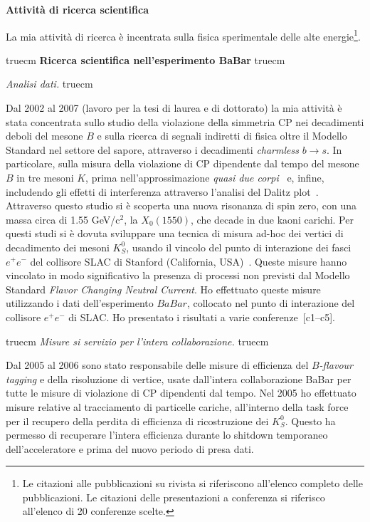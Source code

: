 \documentclass[11pt,twoside,a4paper]{article}
\begin{document}
\begin{center}
{\bf{Attivit\`a di ricerca scientifica}}
\end{center}

La mia attivit\`a di ricerca \`e incentrata sulla fisica sperimentale
delle alte energie\footnote{Le citazioni alle pubblicazioni su rivista
si riferiscono all'elenco completo delle pubblicazioni. Le citazioni
delle presentazioni a conferenza si riferisco all'elenco di 20
conferenze scelte.}.


 truecm
{\bf{Ricerca scientifica nell'esperimento BaBar}}
 truecm

\textit{Analisi dati.}
 truecm

Dal 2002 al 2007 (lavoro per la tesi di laurea e di dottorato) la mia
attivit\`a \`e stata concentrata sullo studio della violazione della
simmetria CP nei decadimenti deboli del mesone $B$ e sulla ricerca di
segnali indiretti di fisica oltre il Modello Standard nel settore del
sapore, attraverso i decadimenti \textit{charmless} $b \to s$. In
particolare, sulla misura della violazione di CP dipendente dal tempo
del mesone $B$ in tre mesoni $K$, prima nell'approssimazione
\textit{quasi due corpi}~\cite{Aubert:2008rr} e, infine, includendo
gli effetti di interferenza attraverso l'analisi del Dalitz
plot~\cite{Aubert:2007sd,Aubert:2007me}. Attraverso questo studio si
\`e scoperta una nuova risonanza di spin zero, con una massa circa di
1.55 GeV/c$^2$, la $X_0(1550)$, che decade in due kaoni carichi. Per
questi studi si \`e dovuta sviluppare una tecnica di misura ad-hoc dei
vertici di decadimento dei mesoni $K^0_S$, usando il vincolo del punto
di interazione dei fasci $e^+e^-$ del collisore SLAC di Stanford
(California, USA)~\cite{Aubert:2005dy,Aubert:2005gj}.  Queste misure
hanno vincolato in modo significativo la presenza di processi non
previsti dal Modello Standard \textit{Flavor Changing Neutral
  Current}.  Ho effettuato queste misure utilizzando i dati
dell'esperimento $BaBar$, collocato nel punto di interazione del
collisore $e^+e^-$ di SLAC. Ho presentato i risultati a varie
conferenze~[c1--c5].

 truecm
\textit{Misure si servizio per l'intera collaborazione.}
 truecm

Dal 2005 al 2006 sono stato responsabile delle misure di efficienza
del \textit{$B$-flavour tagging} e della risoluzione di vertice, usate
dall'intera collaborazione BaBar per tutte le misure di violazione di
CP dipendenti dal tempo. Nel 2005 ho effettuato misure relative al
tracciamento di particelle cariche, all'interno della task force per
il recupero della perdita di efficienza di ricostruzione dei
$K^0_S$. Questo ha permesso di recuperare l'intera efficienza durante
lo shitdown temporaneo dell'acceleratore e prima del nuovo periodo di
presa dati.
\end{document}
